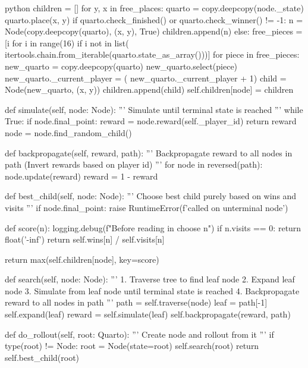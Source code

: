 \begin{mintedbox}{python}
        children = []
        for y, x in free_places:
            quarto = copy.deepcopy(node._state)
            quarto.place(x, y)
            if quarto.check_finished() or quarto.check_winner() != -1:
                n = Node(copy.deepcopy(quarto), (x, y), True)
                children.append(n)
            else:
                free_pieces = [i for i in range(16) if i not in list(
                    itertools.chain.from_iterable(quarto.state_as_array()))]
                for piece in free_pieces:
                    new_quarto = copy.deepcopy(quarto)
                    new_quarto.select(piece)
                    new_quarto._current_player = (
                        new_quarto._current_player + 1) %
                    child = Node(new_quarto, (x, y))
                    children.append(child)
        self.children[node] = children

    def simulate(self, node: Node):
        '''
        Simulate until terminal state is reached
        '''
        while True:
            if node.final_point:
                reward = node.reward(self._player_id)
                return reward
            node = node.find_random_child()

    def backpropagate(self, reward, path):
        '''
        Backpropagate reward to all nodes in path
        (Invert rewards based on player id)
        '''
        for node in reversed(path):
            node.update(reward)
            reward = 1 - reward

    def best_child(self, node: Node):
        '''
        Choose best child purely based on wins and visits
        '''
        if node.final_point:
            raise RuntimeError(f'called on unterminal node')

        def score(n):
            logging.debug(f"Before reading in choose {n}")
            if n.visits == 0:
                return float('-inf')
            return self.wins[n] / self.visits[n]

        return max(self.children[node], key=score)

    def search(self, node: Node):
        '''
        1. Traverse tree to find leaf node
        2. Expand leaf node
        3. Simulate from leaf node until terminal state is reached
        4. Backpropagate reward to all nodes in path
        '''
        path = self.traverse(node)
        leaf = path[-1]
        self.expand(leaf)
        reward = self.simulate(leaf)
        self.backpropagate(reward, path)

    def do_rollout(self, root: Quarto):
        '''
        Create node and rollout from it
        '''
        if type(root) != Node:
            root = Node(state=root)
        self.search(root)
        return self.best_child(root)


\end{mintedbox}
